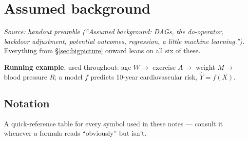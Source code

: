 \section{Assumed background}
\label{sec:background}

\emph{Source: handout preamble (``Assumed background: DAGs, the do-operator,
backdoor adjustment, potential outcomes, regression, a little machine
learning.'').} Everything from \S\ref{sec:bigpicture} onward leans on all six
of these.

\textbf{Running example}, used throughout: age $W \to$ exercise $A \to$
weight $M \to$ blood pressure $R$; a model $f$ predicts 10-year
cardiovascular risk, $\hat Y = f(X)$.

\subsection{Notation}
\label{sec:notation}

A quick-reference table for every symbol used in these notes --- consult it
whenever a formula reads ``obviously'' but isn't.

